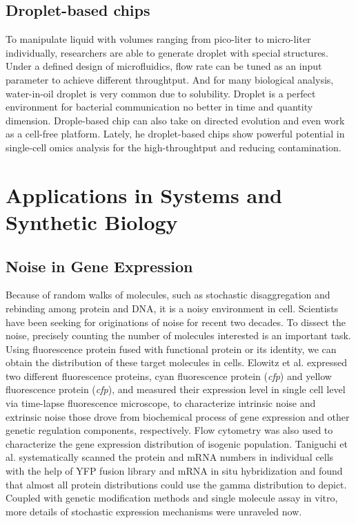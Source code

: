 \documentclass[fleqn,10pt]{wlscirep}
\begin{document}
\subsection[]{Droplet-based chips}

To manipulate liquid with volumes ranging from pico-liter to micro-liter individually, researchers are able to generate droplet with special structures\cite{Collins2015}. Under a defined design of microfluidics, flow rate can be tuned as an input parameter to achieve different throughtput. And for many biological analysis, water-in-oil droplet is very common due to solubility. Droplet is a perfect environment for bacterial communication no better in time and quantity dimension\cite{Boedicker2009,Weitz2014,Jeong2015}. Drople-based chip can also take on directed evolution\cite{Agresti2010} and even work as a cell-free platform\cite{Hansen2016}. Lately, he droplet-based chips show powerful potential in single-cell omics analysis for the high-throughtput and reducing contamination\cite{Macosko2015,Zilionis2017,Kang2018}. 

\section[]{Applications in Systems and Synthetic Biology}
\subsection[]{Noise in Gene Expression}

Because of random walks of molecules, such as stochastic disaggregation and rebinding among protein and DNA, it is a
noisy environment in cell. Scientists have been seeking for originations of noise for recent two decades. To dissect the noise, precisely counting the number of molecules interested is an important task. Using fluorescence protein fused with functional protein or its identity, we can obtain the distribution of these target molecules in cells. Elowitz et al.\cite{Elowitz2002} expressed two different fluorescence proteins, cyan fluorescence protein (\textit{cfp}) and yellow fluorescence protein (\textit{cfp}), and measured their expression level in single cell level via time-lapse fluorescence microscope, to characterize intrinsic noise and extrinsic noise those drove from biochemical process of gene expression and other genetic regulation components, respectively. Flow cytometry was also used to characterize the gene expression distribution of isogenic population\cite{Shapiro2006}. Taniguchi et al.\cite{Taniguchi2010} systematically scanned the protein and mRNA numbers in individual cells with the help of YFP fusion library and mRNA in situ hybridization and found that almost all protein distributions could use the gamma distribution to depict. Coupled with genetic modification methods\cite{Jones2014} and single molecule assay in vitro\cite{Chong2014}, more details of stochastic expression mechanisms were unraveled now.
\end{document}
